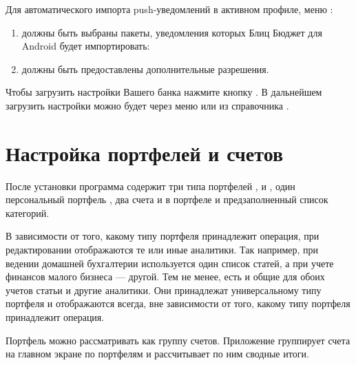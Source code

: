 \documentclass[a4paper,10pt,russian]{sphinxmanual}
\begin{document}
Для автоматического импорта push-уведомлений в активном профиле, меню :
\begin{enumerate}
\def\theenumi{\arabic{enumi}}
\def\labelenumi{\theenumi .}
\makeatletter\def\p@enumii{\p@enumi \theenumi .}\makeatother
\item {} 
должны быть выбраны пакеты, уведомления которых Блиц Бюджет для Android будет импортировать:

\item {} 
должны быть предоставлены дополнительные разрешения.

\end{enumerate}

Чтобы загрузить настройки Вашего банка нажмите кнопку . В дальнейшем загрузить
настройки можно будет через меню  или из справочника
.

\noindent{}

\noindent{}


\section{Настройка портфелей и счетов}
\label{\detokenize{getting-started:id4}}
После установки программа содержит три типа портфелей ,  и ,
один персональный портфель , два счета  и  в портфеле  и предзаполненный
список категорий.

В зависимости от того, какому типу портфеля принадлежит операция, при редактировании отображаются те или иные аналитики.  Так например,
при ведении домашней бухгалтерии используется один список статей, а при учете финансов малого бизнеса — другой.
Тем не менее, есть и общие для обоих учетов статьи и другие аналитики. Они принадлежат универсальному типу портфеля и
отображаются всегда, вне зависимости от того, какому типу портфеля принадлежит операция.

Портфель можно рассматривать как группу счетов. Приложение группирует счета на главном экране по портфелям и рассчитывает
по ним сводные итоги.
\end{document}
